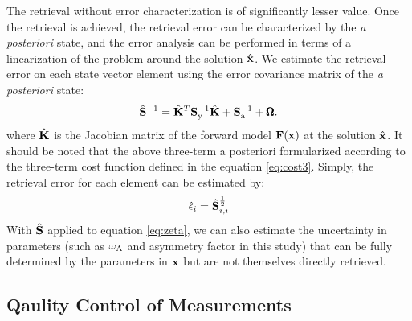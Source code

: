 The retrieval without error characterization is of significantly lesser
value. Once the retrieval is achieved, the retrieval error can be
characterized by the \textit{a posteriori} state, and the error analysis 
can be performed in terms of a linearization of the problem around 
the solution $\hat{\mathbf{x}}$. We estimate the retrieval error on each 
state vector element using the error covariance matrix of the 
\textit{a posteriori} state:
\begin{equation}
\hat{\mathbf{S}}^{-1} = \hat{\mathbf{K}}^T\mathbf{S}_\text{y}^{-1}\hat{\mathbf{K}}+\mathbf{S}_\text{a}^{-1} +
\pmb{\Omega}. 
\label{eq:shat3}
\end{equation}
where $\hat{\mathbf{K}}$ is the Jacobian matrix of the forward model $\mathbf{F}(\mathbf{x})$ 
at the solution $\hat{\mathbf{x}}$. It should be noted that the above 
three-term a posteriori formularized according to the three-term cost 
function defined in the equation \eqref{eq:cost3}. Simply, the retrieval 
error for each element can be estimated by:
\begin{equation}
\hat{\epsilon}_i=\hat{\mathbf{S}}_{i,i}^{\frac{1}{2}}
\end{equation}
With $\hat{\mathbf{S}}$ applied to equation \eqref{eq:zeta}, we can also estimate
the uncertainty in parameters (such as $\omega_\text{A}$ and asymmetry factor in this
study) that can be fully determined by the parameters in $\mathbf{x}$ but are not
themselves directly retrieved.

\subsection{Qaulity Control of Measurements}

